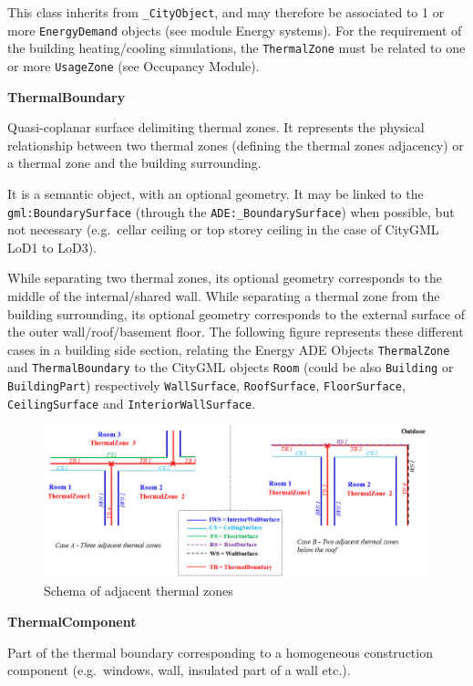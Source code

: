 \documentclass[a4paper,12pt]{article}
\begin{document}
This class inherits from \texttt{\_CityObject}, and may therefore be
associated to 1 or more \texttt{EnergyDemand} objects (see module Energy
systems). For the requirement of the building heating/cooling
simulations, the \texttt{ThermalZone} must be related to one or more
\texttt{UsageZone} (see Occupancy Module).

\textbf{ThermalBoundary}

Quasi-coplanar surface delimiting thermal zones. It represents the
physical relationship between two thermal zones (defining the thermal
zones adjacency) or a thermal zone and the building surrounding.

It is a semantic object, with an optional geometry. It may be linked to
the \texttt{gml:BoundarySurface} (through the
\texttt{ADE:\_BoundarySurface}) when possible, but not necessary
(e.g.~cellar ceiling or top storey ceiling in the case of CityGML LoD1
to LoD3).

While separating two thermal zones, its optional geometry corresponds to
the middle of the internal/shared wall. While separating a thermal zone
from the building surrounding, its optional geometry corresponds to the
external surface of the outer wall/roof/basement floor. The following
figure represents these different cases in a building side section,
relating the Energy ADE Objects \texttt{ThermalZone} and
\texttt{ThermalBoundary} to the CityGML objects \texttt{Room} (could be
also \texttt{Building} or \texttt{BuildingPart}) respectively
\texttt{WallSurface}, \texttt{RoofSurface}, \texttt{FloorSurface},
\texttt{CeilingSurface} and \texttt{InteriorWallSurface}.

\begin{figure}[htbp]
\centering
\includegraphics{fig/ThermalZoneAdjacency.png}
\caption{Schema of adjacent thermal zones}
\end{figure}

\textbf{ThermalComponent}

Part of the thermal boundary corresponding to a homogeneous construction
component (e.g.~windows, wall, insulated part of a wall etc.).
\end{document}
